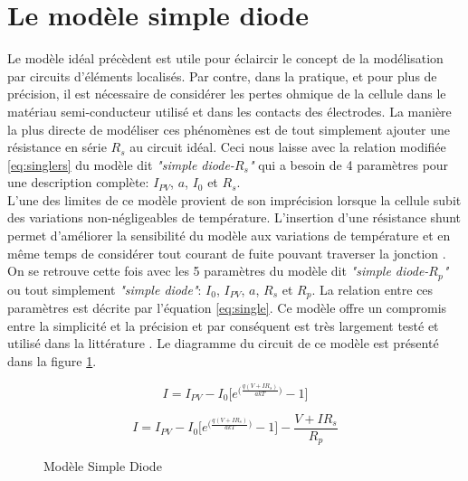 \section{Le modèle simple diode}
Le modèle idéal précèdent est utile pour éclaircir le concept de la modélisation par circuits d'éléments localisés. Par contre, dans la pratique, et pour plus de précision, il est nécessaire de considérer les pertes ohmique de la cellule dans le matériau semi-conducteur utilisé et dans les contacts des électrodes. La manière la plus directe de modéliser ces phénomènes est de tout simplement ajouter une résistance en série $R_s$ au circuit idéal. Ceci nous laisse avec la relation modifiée \ref{eq:singlers} du modèle dit \textit{"simple diode-$R_s$"} qui a besoin de 4 paramètres pour une description complète: $I_{PV}$, $a$, $I_0$ et $R_s$.\\
L'une des limites de ce modèle provient de son imprécision lorsque la cellule subit des variations non-négligeables de température. L'insertion d'une résistance shunt permet d'améliorer la sensibilité du modèle aux variations de température et en même temps de considérer tout courant de fuite pouvant traverser la jonction \cite{Chin2015b}. On se retrouve cette fois avec les 5 paramètres du modèle dit \textit{"simple diode-$R_p$"} ou tout simplement \textit{"simple diode"}: $I_0$, $I_{PV}$, $a$, $R_s$ et $R_p$. La relation entre ces paramètres est décrite par l'équation \ref{eq:single}. Ce modèle offre un compromis entre la simplicité et la précision et par conséquent est très largement testé et utilisé dans la littérature \cite{Carrero2007}. Le diagramme du circuit de ce modèle est présenté dans la figure \ref{fig:single}.

\begin{equation}
  \label{eq:singlers}
  I = I_{PV} - I_0 \bigg[e^{\big(\frac{q(V + IR_s)}{akT}\big)} - 1\bigg]
\end{equation}

\begin{equation}
  \label{eq:single}
  I = I_{PV} - I_0 \bigg[e^{\big(\frac{q(V + IR_s)}{akT}\big)} - 1\bigg] - \frac{V + I R_s}{R_p}
\end{equation}

\begin{figure}
  \begin{center}
    \shorthandoff{:!}
    \shorthandon{:!}
    \caption{Modèle Simple Diode}
    \label{fig:single}
  \end{center}
\end{figure}



